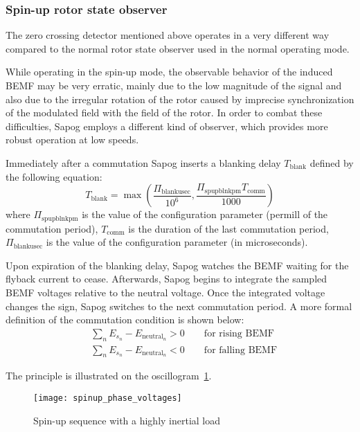 \documentclass{zubaxdoc}
\begin{document}
\subsubsection{Spin-up rotor state observer}

The zero crossing detector mentioned above operates in a very different way compared to the
normal rotor state observer used in the normal operating mode.

While operating in the spin-up mode, the observable behavior of the induced BEMF may be very erratic,
mainly due to the low magnitude of the signal and also due to the irregular rotation of the rotor caused by
imprecise synchronization of the modulated field with the field of the rotor.
In order to combat these difficulties, Sapog employs a different kind of observer, which provides
more robust operation at low speeds.

Immediately after a commutation Sapog inserts a blanking delay $T_\text{blank}$
defined by the following equation:
\begin{equation}
T_{\text{blank}}=
\max \left(\frac{\Pi_{\text{blankusec}}}{10^6},
\frac{\Pi_{\text{spupblnkpm}} T_{\text{comm}}}{1000}\right)
\end{equation}
where $\Pi_{\text{spupblnkpm}}$ is the value of the configuration parameter 
(permill of the commutation period),
$T_{\text{comm}}$ is the duration of the last commutation period,
$\Pi_{\text{blankusec}}$ is the value of the configuration parameter 
(in microseconds).

Upon expiration of the blanking delay, Sapog watches the BEMF waiting for the flyback current to cease.
Afterwards, Sapog begins to integrate the sampled BEMF voltages relative to the neutral voltage.
Once the integrated voltage changes the sign, Sapog switches to the next commutation period.
A more formal definition of the commutation condition is shown below:
\begin{equation}
\begin{aligned}
&\sum_{n} E_{s_n} - E_{\text{neutral}_n} > 0 \qquad\text{for rising BEMF}\\
&\sum_{n} E_{s_n} - E_{\text{neutral}_n} < 0 \qquad\text{for falling BEMF}
\end{aligned}
\end{equation}

The principle is illustrated on the oscillogram~\ref{spinup_phase_voltages}.

\begin{figure}[hbt]
    \centering
    \texttt{[image: spinup\_phase\_voltages]}
    \caption{Spin-up sequence with a highly inertial load
    \label{spinup_phase_voltages}}
\end{figure}
\end{document}
